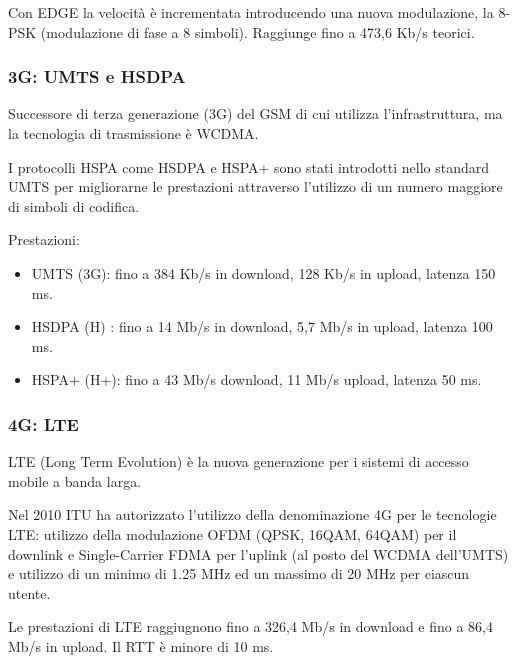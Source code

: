             Con EDGE la velocità è incrementata introducendo una nuova modulazione, la 8-PSK (modulazione di fase a 8 simboli). Raggiunge fino a 473,6 Kb/s teorici.

        \subsubsection{3G: UMTS e HSDPA}
            Successore di terza generazione (3G) del GSM di cui utilizza l'infrastruttura, ma la tecnologia di trasmissione è WCDMA.
        
            I protocolli HSPA come HSDPA e HSPA+ sono stati introdotti nello standard UMTS per migliorarne le prestazioni attraverso l’utilizzo di un numero maggiore di simboli di codifica.
        
            Prestazioni:
            \begin{itemize}
                \item UMTS (3G): fino a 384 Kb/s in download, 128 Kb/s in upload, latenza 150 ms.
                \item HSDPA (H) : fino a 14 Mb/s in download, 5,7 Mb/s in upload, latenza 100 ms.
                \item HSPA+ (H+): fino a 43 Mb/s download, 11 Mb/s upload, latenza 50 ms.
            \end{itemize}

        \subsubsection{4G: LTE}
            LTE (Long Term Evolution) è la nuova generazione per i sistemi di accesso mobile a banda larga.

            Nel 2010 ITU ha autorizzato l'utilizzo della denominazione 4G per le tecnologie LTE: utilizzo della modulazione OFDM (QPSK, 16QAM, 64QAM) per il downlink e Single-Carrier FDMA per l'uplink (al posto del WCDMA dell'UMTS) e utilizzo di un minimo di 1.25 MHz ed un massimo di 20 MHz per ciascun utente.

            Le prestazioni di LTE raggiugnono fino a 326,4 Mb/s in download e fino a 86,4 Mb/s in upload. Il RTT è minore di 10 ms.